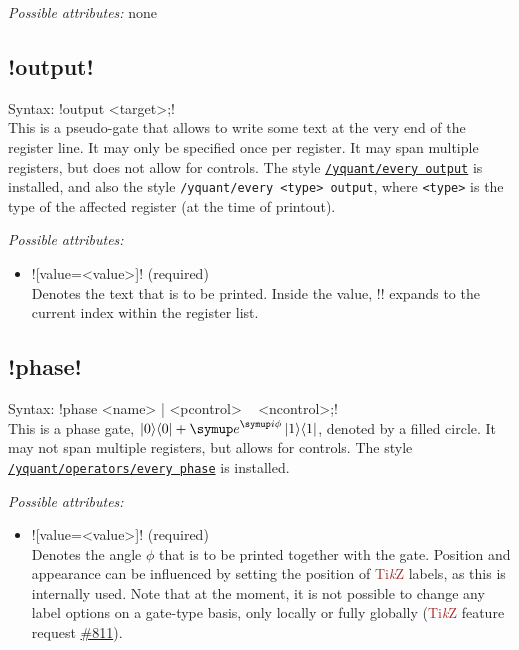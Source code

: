 \documentclass{scrartcl}
\def\TikZ{\textcolor{brown}{Ti\textit kZ}}
\def\style#1{\hyperref[style:#1]{\texttt{#1}}}
\def\ii{{\symup i}}
\def\ee{{\symup e}}
\def\ketbra#1#2{\ket{#1}\!\bra{#2}}
\begin{document}
         \emph{Possible attributes:} none

      \subsection[\texorpdfstring{\yquant!output!}{output}]{\yquant!output!}\label{gate:output}
         Syntax: \yquant!output <target>;! \\
         This is a pseudo\hyp gate that allows to write some text at the very end of the register line.
         It may only be specified once per register.
         It may span multiple registers, but does not allow for controls.
         The style \style{/yquant/every output} is installed, and also the style \texttt{/yquant/every <type> output}, where \texttt{<type>} is the type of the affected register (at the time of printout).

         \emph{Possible attributes:}
         \begin{itemize}
            \item \yquant![value=<value>]! (required) \\
               Denotes the text that is to be printed.
               Inside the value, \tex!\idx! expands to the current index within the register list.
         \end{itemize}

      \subsection{\texorpdfstring{\yquant!phase!}{phase}}\label{gate:phase}
         Syntax: \yquant!phase <name> | <pcontrol> ~ <ncontrol>;! \\
         This is a phase gate, $\ketbra00 + \ee^{\ii\phi} \ketbra11$, denoted by a filled circle.
         It may not span multiple registers, but allows for controls.
         The style \style{/yquant/operators/every phase} is installed.

         \emph{Possible attributes:}
         \begin{itemize}
            \item \yquant![value=<value>]! (required) \\
               Denotes the angle $\phi$ that is to be printed together with the gate.
               Position and appearance can be influenced by setting the position of \TikZ{} labels, as this is internally used.
               Note that at the moment, it is not possible to change any label options on a gate\hyp type basis, only locally or fully globally (\TikZ{} feature request \href{https://github.com/pgf-tikz/pgf/issues/811}{\#811}).
         \end{itemize}
\end{document}
